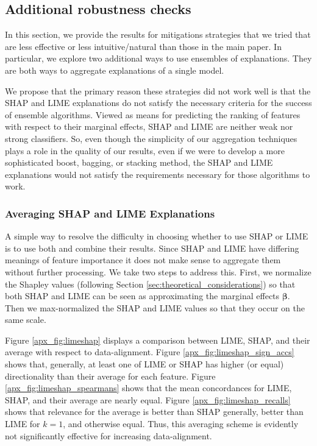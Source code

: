 \documentclass[mnsc,blindrev]{informs3}
\begin{document}
    
    
    
  
    \subsection{Additional robustness checks}
        \label{apx_sec:additional_mitigations}
        In this section, we provide the results for mitigations strategies that we tried that are less effective or less intuitive/natural than those in the main paper. In particular, we explore two additional ways to use ensembles of explanations. They are both ways to aggregate explanations of a single model. 
        
        We propose that the primary reason these strategies did not work well is that the SHAP and LIME explanations do not satisfy the necessary criteria for the success of ensemble algorithms. Viewed as means for predicting the ranking of features with respect to their marginal effects, SHAP and LIME are neither weak nor strong classifiers. So, even though the simplicity of our aggregation techniques plays a role in the quality of our results, even if we were to develop a more sophisticated boost, bagging, or stacking method, the SHAP and LIME explanations would not satisfy the requirements necessary for those algorithms to work. %

            \subsubsection{Averaging SHAP and LIME Explanations}
            A simple way to resolve the difficulty in choosing whether to use SHAP or LIME is to use both and combine their results. Since SHAP and LIME have differing meanings of feature importance it does not make sense to aggregate them without further processing. We take two steps to address this. First, we normalize the Shapley values (following Section \ref{sec:theoretical_considerations}) so that both SHAP and LIME can be seen as approximating the marginal effects $\boldsymbol{\beta}$. Then we max-normalized the SHAP and LIME values so that they occur on the same scale. 

            Figure \ref{apx_fig:limeshap} displays a comparison between LIME, SHAP, and their average with respect to data-alignment. Figure \ref{apx_fig:limeshap_sign_accs} shows that, generally, at least one of LIME or SHAP has higher (or equal) directionality than their average for each feature. Figure \ref{apx_fig:limeshap_spearmans} shows that the mean concordances for LIME, SHAP, and their average are nearly equal. Figure \ref{apx_fig:limeshap_recalls} shows that relevance for the average is better than SHAP generally, better than LIME for $k=1$, and otherwise equal. Thus, this averaging scheme is evidently not significantly effective for increasing data-alignment. 
\end{document}
